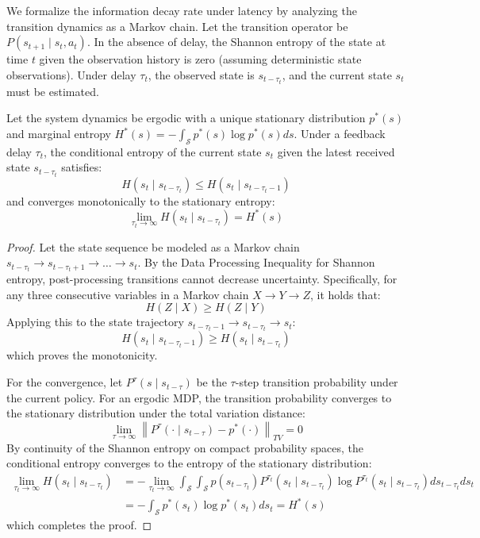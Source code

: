 \documentclass[manuscript, screen, review]{jair}
\begin{document}
We formalize the information decay rate under latency by analyzing the transition dynamics as a Markov chain. Let the transition operator be $P(s_{t+1} \mid s_t, a_t)$. In the absence of delay, the Shannon entropy of the state at time $t$ given the observation history is zero (assuming deterministic state observations). Under delay $\tau_t$, the observed state is $s_{t-\tau_t}$, and the current state $s_t$ must be estimated.

\begin{lemma}\label{lem:entropy_growth}
Let the system dynamics be ergodic with a unique stationary distribution $p^*(s)$ and marginal entropy $H^*(s) = -\int_{\mathcal{S}} p^*(s) \log p^*(s) ds$. Under a feedback delay $\tau_t$, the conditional entropy of the current state $s_t$ given the latest received state $s_{t-\tau_t}$ satisfies:
\begin{equation}
    H(s_t \mid s_{t-\tau_t}) \le H(s_t \mid s_{t-\tau_t-1})
\end{equation}
and converges monotonically to the stationary entropy:
\begin{equation}
    \lim_{\tau_t \to \infty} H(s_t \mid s_{t-\tau_t}) = H^*(s)
\end{equation}
\end{lemma}

\begin{proof}
Let the state sequence be modeled as a Markov chain $s_{t-\tau_t} \to s_{t-\tau_t+1} \to \dots \to s_t$. By the Data Processing Inequality for Shannon entropy, post-processing transitions cannot decrease uncertainty. Specifically, for any three consecutive variables in a Markov chain $X \to Y \to Z$, it holds that:
\begin{equation*}
    H(Z \mid X) \ge H(Z \mid Y)
\end{equation*}
Applying this to the state trajectory $s_{t-\tau_t-1} \to s_{t-\tau_t} \to s_t$:
\begin{equation*}
    H(s_t \mid s_{t-\tau_t-1}) \ge H(s_t \mid s_{t-\tau_t})
\end{equation*}
which proves the monotonicity.

For the convergence, let $P^{\tau}(s \mid s_{t-\tau})$ be the $\tau$-step transition probability under the current policy. For an ergodic MDP, the transition probability converges to the stationary distribution under the total variation distance:
\begin{equation*}
    \lim_{\tau \to \infty} \left\| P^{\tau}(\cdot \mid s_{t-\tau}) - p^*(\cdot) \right\|_{TV} = 0
\end{equation*}
By continuity of the Shannon entropy on compact probability spaces, the conditional entropy converges to the entropy of the stationary distribution:
\begin{align*}
    \lim_{\tau_t \to \infty} H(s_t \mid s_{t-\tau_t}) &= -\lim_{\tau_t \to \infty} \int_{\mathcal{S}} \int_{\mathcal{S}} p(s_{t-\tau_t}) P^{\tau_t}(s_t \mid s_{t-\tau_t}) \log P^{\tau_t}(s_t \mid s_{t-\tau_t}) ds_{t-\tau_t} ds_t \\
    &= -\int_{\mathcal{S}} p^*(s_t) \log p^*(s_t) ds_t = H^*(s)
\end{align*}
which completes the proof.
\end{proof}
\end{document}
